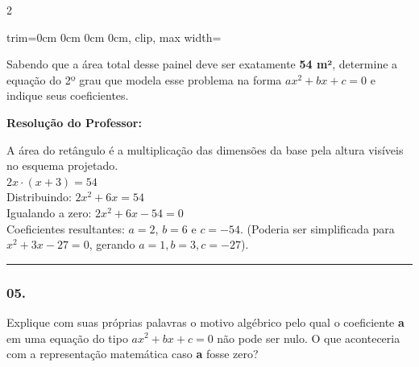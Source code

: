 \begin{multicols*}{2}
\begin{center}
\begin{adjustbox}{trim=0cm 0cm 0cm 0cm, clip, max width=\larguraTikz}
\end{adjustbox}
\end{center}

Sabendo que a área total desse painel deve ser exatamente \textbf{54 m²}, determine a equação do 2º grau que modela esse problema na forma $ ax^2 + bx + c = 0 $ e indique seus coeficientes.

\ifgabarito
    \begin{tcolorbox}[colback=CorTitUm!5, colframe=CorTitUm, boxrule=1pt, arc=4pt, left=6pt, right=6pt, top=6pt, bottom=6pt]
    \small\textbf{\textcolor{CorTitUm}{Resolução do Professor:}}\par\vspace{0.1cm}
    \color{CinzaEscuro}
    A área do retângulo é a multiplicação das dimensões da base pela altura visíveis no esquema projetado.\\
    $2x \cdot (x + 3) = 54$\\
    Distribuindo: $2x^2 + 6x = 54$\\
    Igualando a zero: $2x^2 + 6x - 54 = 0$\\
    Coeficientes resultantes: $a = 2$, $b = 6$ e $c = -54$. (Poderia ser simplificada para $x^2+3x-27=0$, gerando $a=1, b=3, c=-27$).
    \end{tcolorbox}
\fi

\par\vspace{\espacoQuestao}

\noindent\textcolor{CorLinha}{\rule{\linewidth}{0.5pt}} 
\par\vspace{\espacoPreQuestao}
\subsubsection*{05.} Explique com suas próprias palavras o motivo algébrico pelo qual o coeficiente \textbf{a} em uma equação do tipo $ ax^2 + bx + c = 0 $ não pode ser nulo. O que aconteceria com a representação matemática caso \textbf{a} fosse zero?


\end{multicols*}
